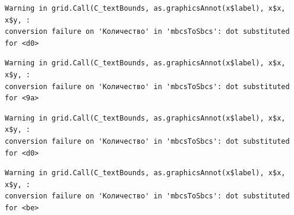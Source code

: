 \documentclass[
  letterpaper,
  DIV=11,
  numbers=noendperiod]{scrreprt}
\newenvironment{Shaded}{}{}
\newcommand{\AttributeTok}[1]{\textcolor[rgb]{0.84,0.23,0.29}{#1}}
\newcommand{\ConstantTok}[1]{\textcolor[rgb]{0.00,0.36,0.77}{#1}}
\newcommand{\ControlFlowTok}[1]{\textcolor[rgb]{0.84,0.23,0.29}{#1}}
\newcommand{\DecValTok}[1]{\textcolor[rgb]{0.00,0.36,0.77}{#1}}
\newcommand{\FunctionTok}[1]{\textcolor[rgb]{0.44,0.26,0.76}{#1}}
\newcommand{\NormalTok}[1]{\textcolor[rgb]{0.14,0.16,0.18}{#1}}
\newcommand{\OtherTok}[1]{\textcolor[rgb]{0.44,0.26,0.76}{#1}}
\newcommand{\SpecialCharTok}[1]{\textcolor[rgb]{0.00,0.36,0.77}{#1}}
\newcommand{\StringTok}[1]{\textcolor[rgb]{0.01,0.18,0.38}{#1}}
\theoremstyle{definition}
\theoremstyle{remark}
\begin{document}
\begin{Shaded}
\end{Shaded}

\begin{verbatim}
Warning in grid.Call(C_textBounds, as.graphicsAnnot(x$label), x$x, x$y, :
conversion failure on 'Количество' in 'mbcsToSbcs': dot substituted for <d0>
\end{verbatim}

\begin{verbatim}
Warning in grid.Call(C_textBounds, as.graphicsAnnot(x$label), x$x, x$y, :
conversion failure on 'Количество' in 'mbcsToSbcs': dot substituted for <9a>
\end{verbatim}

\begin{verbatim}
Warning in grid.Call(C_textBounds, as.graphicsAnnot(x$label), x$x, x$y, :
conversion failure on 'Количество' in 'mbcsToSbcs': dot substituted for <d0>
\end{verbatim}

\begin{verbatim}
Warning in grid.Call(C_textBounds, as.graphicsAnnot(x$label), x$x, x$y, :
conversion failure on 'Количество' in 'mbcsToSbcs': dot substituted for <be>
\end{verbatim}
\end{document}
